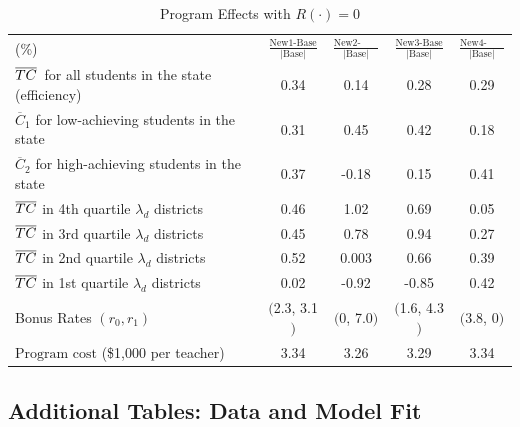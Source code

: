 \documentclass[notitlepage,12pt]{article}%
\begin{document}
\begin{table}[ptb]
\caption{Program Effects with $R\left(  \cdot\right)  =0$}%
\label{tab:XXX3}
\begin{center}%
\begin{tabular}
[c]{lcccc}\hline\hline
(\%) & $\frac{\text{New1-Base}}{\left\vert \text{Base}\right\vert }$ &
$\frac{\text{New2-Base}}{\left\vert \text{Base}\right\vert }$ & $\frac
{\text{New3-Base}}{\left\vert \text{Base}\right\vert }$ & $\frac
{\text{New4-Base}}{\left\vert \text{Base}\right\vert }$\\
$\overline{{\small TC}}${\small \ for all students in the state (efficiency)}
& 0.34 & 0.14 & 0.28 & 0.29\\
$\overline{C}_{1}$ {\small for low-achieving students in the state} & 0.31 &
0.45 & 0.42 & 0.18\\
$\overline{C}_{2}$ {\small for high-achieving students in the state} & 0.37 &
-0.18 & 0.15 & 0.41\\
$\overline{{\small TC}}\ ${\small in 4th quartile }$\lambda_{d}$
{\small districts} & 0.46 & 1.02 & 0.69 & 0.05\\
$\overline{{\small TC}}\ ${\small in 3rd quartile }$\lambda_{d}$
{\small districts} & 0.45 & 0.78 & 0.94 & 0.27\\
$\overline{{\small TC}}\ ${\small in 2nd quartile }$\lambda_{d}$
{\small districts} & 0.52 & 0.003 & 0.66 & 0.39\\
$\overline{{\small TC}}$ {\small in 1st quartile }$\lambda_{d}$
{\small districts} & 0.02 & -0.92 & -0.85 & 0.42\\\hline
Bonus Rates $\left(  r_{0},r_{1}\right)  $ & $($2.3, 3.1$)$ & $($0, 7.0$)$ &
$($1.6, 4.3$)$ & $($3.8, 0$)$\\
Pr$\text{ogram cost }$(\$1,000 per teacher) & 3.34 & 3.26 & 3.29 &
3.34\\\hline\hline
\end{tabular}
\end{center}
\end{table}

\pagebreak\clearpage


\subsection*{Additional Tables: Data and Model Fit}
\end{document}

